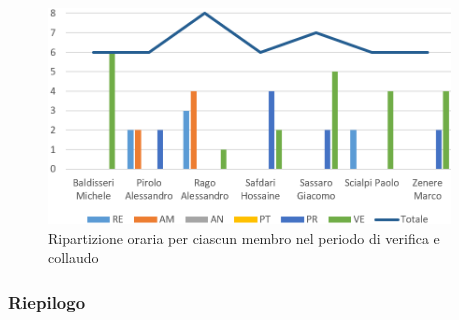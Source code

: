 \begin{figure}[!htb]   
    \centering
    \includegraphics[width=0.95\textwidth]{Images/prev10}
	\caption{Ripartizione oraria per ciascun membro nel periodo di verifica e collaudo}
\end{figure}

\subsubsection{Riepilogo}

